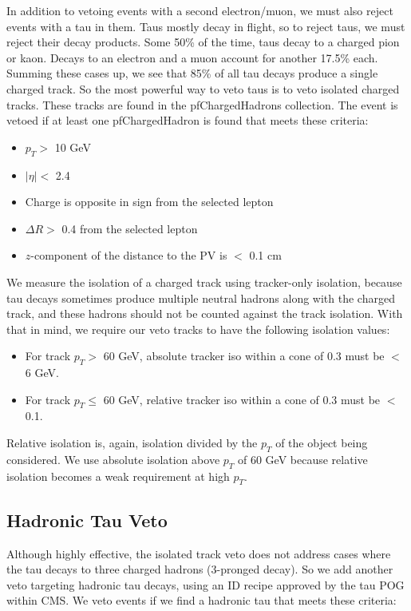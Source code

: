 In addition to vetoing events with a second electron/muon, we must
also reject events with a tau in them. Taus mostly decay in flight, so
to reject taus, we must reject their decay products. Some 50\% of the
time, taus decay to a charged pion or kaon. Decays to an electron and
a muon account for another 17.5\% each. Summing these cases up, we see
that 85\% of all tau decays produce a single charged track. So the
most powerful way to veto taus is to veto isolated charged
tracks. These tracks are found in the pfChargedHadrons collection. The
event is vetoed if at least one pfChargedHadron is found that meets these
criteria:
\begin{itemize}
\item $p_T >$ 10 GeV
\item $|\eta| <$ 2.4
\item Charge is opposite in sign from the selected lepton
\item $\Delta R >$ 0.4 from the selected lepton
\item $z$-component of the distance to the PV is $<$ 0.1 cm
\end{itemize}
We measure the isolation of a charged track using tracker-only
isolation, because tau decays sometimes produce multiple neutral
hadrons along with the charged track, and these hadrons should not be
counted against the track isolation. With that in mind, we require our
veto tracks to have the following isolation values:
\begin{itemize}
\item For track $p_T >$ 60 GeV, absolute tracker iso within a cone of
  0.3 must be $<$ 6 GeV.
\item For track $p_T \leq$ 60 GeV, relative tracker iso within a cone
  of 0.3 must be  $<$ 0.1.
\end{itemize}
Relative isolation is, again, isolation divided by the $p_T$ of the
object being considered. We use absolute isolation above $p_T$ of 60
GeV because relative isolation becomes a weak requirement at high
$p_T$.

\subsection{Hadronic Tau Veto}
\label{ssec:stop:hadtauveto}

Although highly effective, the isolated track veto does not address
cases where the tau decays to three charged hadrons (3-pronged
decay). So we add another veto targeting hadronic tau decays, using an
ID recipe approved by the tau POG within CMS. We veto events if we
find a hadronic tau that meets these criteria:

